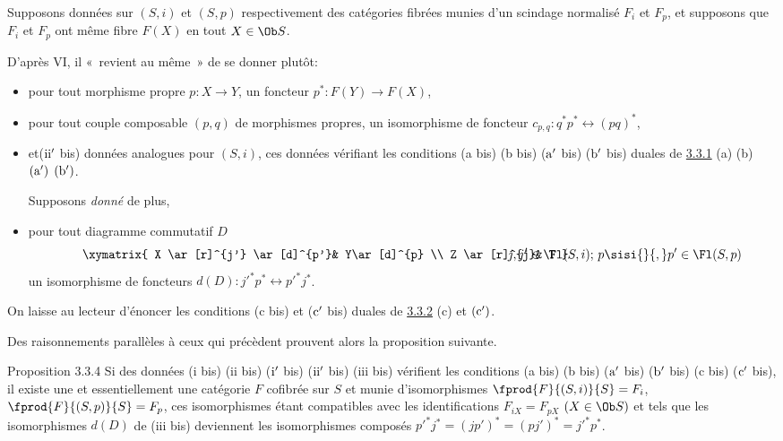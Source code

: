 \documentclass[10pt]{../fichiers-configuration-latex/smfart}
\begin{document}
\subsubsection{}

Supposons données sur $(S,i)$ et $(S,p)$ respectivement des catégories
fibrées munies d'un scindage normalisé $F_i$ et $F_p$, et supposons
que $F_i$ et $F_p$ ont même fibre $F(X)$ en tout $X\in \Ob S$.

D'après  VI, il « revient au même »  de se donner plutôt:
\begin{itemize}
\item[(i bis)] pour tout morphisme propre $p:X\rightarrow Y$, un
foncteur $p^{\ast}:F(Y)\rightarrow F(X)$,

\item[(ii bis)] pour tout couple composable $(p,q)$ de morphismes
propres, un isomorphisme de foncteur
$c_{p,q}:q^{\ast}p^{\ast}\leftrightarrow (pq)^{\ast}$,

\item[(${\rm i'}$ bis)] et\pageoriginale (${\rm ii'}$ bis) données analogues pour
$(S,i)$, ces données vérifiant les conditions (a bis) (b bis) (${\rm a'}$ bis)
(${\rm b'}$ bis) duales de \hyperref[XVII.subsubsec3.3.1]{3.3.1} (a) (b) ${\rm (a')}$ ${\rm (b')}$.

Supposons \emph{donné} de plus,

\item[(iii bis)] pour tout diagramme commutatif $D$
\[
\vcenter{
\xymatrix{
X \ar[r]^{j'} \ar[d]^{p'}&  Y\ar[d]^{p} \\
Z \ar[r]^{j}& T
}}\quad j,j' \in \Fl(S,i)\text{; }p\sisi{}{,} p' \in \Fl(S,p)
\]
un isomorphisme de foncteurs $d(D):{j'}^{\ast}p^{\ast}\leftrightarrow
{p'}^{\ast}j^{\ast}$.
\end{itemize}

On laisse au lecteur d'énoncer les conditions (c bis) et (${\rm c'}$
bis) duales de \hyperref[XVII.prop3.3.2]{3.3.2} (c) et ${\rm (c')}$.

Des raisonnements parallèles à ceux qui précèdent prouvent alors la
proposition suivante.

\begin{enonce*}{Proposition 3.3.4}
Si des données {\rm (i bis) (ii bis) (${\rm i'}$ bis) (${\rm ii'}$
bis) (iii bis)} vérifient les conditions {\rm (a bis) (b bis) (${\rm
a'}$ bis) (${\rm b'}$ bis) (c bis) (${\rm c'}$ bis)}, il existe une et
essentiellement une catégorie $F$ cofibrée sur $S$ et munie
d'isomorphismes $\fprod{F}{(S,i)}{S}=F_i$, $\fprod{F}{(S,p)}{S}=F_p$,
ces isomorphismes étant compatibles avec les identifications
$F_{iX}=F_{pX}$ $(X\in \Ob S)$ et tels que les isomorphismes $d(D)$ de
{\rm (iii bis)} deviennent les isomorphismes composés
${p'}^{\ast}j^{\ast}=(jp')^{\ast}=(pj')^{\ast}={j'}^{\ast}p^{\ast}$.
\end{enonce*}
\end{document}
